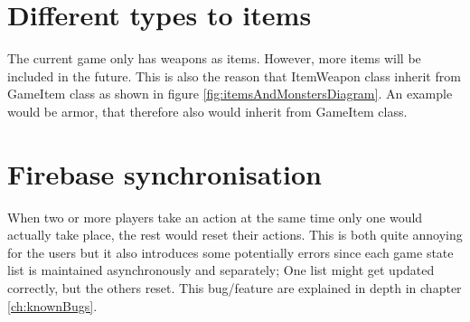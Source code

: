\section{Different types to items}
The current game only has weapons as items. However, more items will be included in the future. This is also the reason that ItemWeapon class inherit from GameItem class as shown in figure \ref{fig:itemsAndMonstersDiagram}. An example would be armor, that therefore also would inherit from GameItem class.

\section{Firebase synchronisation}
When two or more players take an action at the same time only one would actually take place, the rest would reset their actions. This is both quite annoying for the users but it also introduces some potentially errors since each game state list is maintained asynchronously and separately; One list might get updated correctly, but the others reset. This bug/feature are explained in depth in chapter \ref{ch:knownBugs}. 
